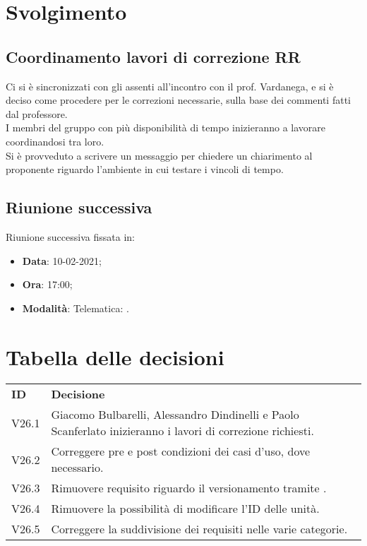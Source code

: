 \documentclass[]{article}
\begin{document}
	\newpage

	\section{Svolgimento}
		\subsection{Coordinamento lavori di correzione RR}
		Ci si è sincronizzati con gli assenti all'incontro con il prof. Vardanega, e si è deciso come procedere per le correzioni necessarie, sulla base dei commenti fatti dal professore. 
		\\
		I membri del gruppo con più disponibilità di tempo inizieranno a lavorare coordinandosi tra loro.\\
		Si è provveduto a scrivere un messaggio per chiedere un chiarimento al proponente riguardo l'ambiente in cui testare i vincoli di tempo.\\
		
		
	\subsection{Riunione successiva}
	Riunione successiva fissata in:
	\begin{itemize}
		\item \textbf{Data}: 10-02-2021;
		\item \textbf{Ora}: 17:00;
		\item \textbf{Modalità}: Telematica: .
	\end{itemize}
		
	\newpage
	
	\section{Tabella delle decisioni}
	
	\begin{table} [h!]
		\begin{center}
			\begin{tabular} { m{2cm} m{14cm} }
				\rowcolor{lightgray}
				\textbf{ID} & \textbf{Decisione}\\
				V26.1 & Giacomo Bulbarelli, Alessandro Dindinelli e Paolo Scanferlato inizieranno i lavori di correzione richiesti.\\
				V26.2 & Correggere pre e post condizioni dei casi d'uso, dove necessario.\\
				V26.3 & Rimuovere requisito riguardo il versionamento tramite \glock{Github}.\\
				V26.4 & Rimuovere la possibilità di modificare l'ID delle unità.\\
				V26.5 & Correggere la suddivisione dei requisiti nelle varie categorie.\\
			\end{tabular}
		\end{center}
	\end{table}
	
\end{document}
